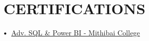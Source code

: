 \documentclass[letterpaper,11pt]{article}
\makeatletter
\newcommand{\resumeItem}[1]{
  \item\small{
    {#1 \vspace{-2pt}}
  }
}
\newcommand{\resumeSubheading}[4]{
  \vspace{-2pt}\item
    \begin{tabular*}{1.0\textwidth}[t]{l@{\extracolsep{\fill}}r}
      \textbf{\large#1} & \textbf{\small #2} \\
      \textit{\large#3} & \textit{\small #4} \\
     
    \end{tabular*}\vspace{-7pt}
}
\newcommand{\resumeSubHeadingListStart}{\begin{itemize}[leftmargin=0.0in, label={}]}
\newcommand{\resumeSubHeadingListEnd}{\end{itemize}}
\newcommand{\resumeItemListStart}{\begin{itemize}}
\newcommand{\resumeItemListEnd}{\end{itemize}\vspace{-5pt}}
\newcommand\sbullet[1][.5]{\mathbin{\vcenter{\hbox{\scalebox{#1}{$\bullet$}}}}}
\makeatother
\begin{document}
                
                




 

\section{CERTIFICATIONS}

    $\sbullet[.75] \hspace{0.1cm}$ {\href{https://drive.google.com/file/d/134Av5jCJXgniiRaALymBmmRwpFkgKZkT/view?usp=sharing}{Adv. SQL \& Power BI - Mithibai College \href{certificateLink.com}{\raisebox{-0.1\height}\faExternalLink }}} \hspace{1.6cm}


\end{document}
